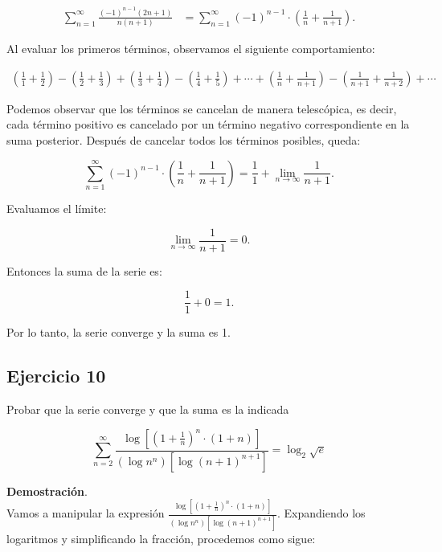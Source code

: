 \documentclass{article}
\begin{document}
    $$
    \begin{align*}
    \sum_{n=1}^{\infty} \frac{(-1)^{n-1}(2 n+1)}{n(n+1)} &= \sum_{n=1}^{\infty}(-1)^{n-1} \cdot\left(\frac{1}{n}+\frac{1}{n+1}\right).
    \end{align*}
    $$

    Al evaluar los primeros términos, observamos el siguiente comportamiento:

    $$
    \begin{gathered}
    \left(\frac{1}{1}+\frac{1}{2}\right) - \left(\frac{1}{2}+\frac{1}{3}\right) + \left(\frac{1}{3}+\frac{1}{4}\right) - \left(\frac{1}{4}+\frac{1}{5}\right) + \cdots + \left(\frac{1}{n}+\frac{1}{n+1}\right) - \left(\frac{1}{n+1}+\frac{1}{n+2}\right) + \cdots
    \end{gathered}
    $$

    Podemos observar que los términos se cancelan de manera telescópica, es decir, cada término positivo es cancelado por un término negativo correspondiente en la suma posterior. Después de cancelar todos los términos posibles, queda:

    $$
    \sum_{n=1}^{\infty}(-1)^{n-1} \cdot\left(\frac{1}{n}+\frac{1}{n+1}\right) = \frac{1}{1} + \lim_{n \rightarrow \infty} \frac{1}{n+1}.
    $$

    Evaluamos el límite:

    $$
    \lim_{n \rightarrow \infty} \frac{1}{n+1} = 0.
    $$

    Entonces la suma de la serie es:

    $$
    \frac{1}{1} + 0 = 1.
    $$

    Por lo tanto, la serie converge y la suma es 1.

    \subsection*{Ejercicio 10}

    Probar que la serie converge y que la suma es la indicada

    $$
    \sum_{n=2}^{\infty} \frac{\log \left[\left(1+\frac{1}{n}\right)^{n} \cdot(1+n)\right]}{\left(\log n^{n}\right)\left[\log (n+1)^{n+1}\right]}=\log _{2} \sqrt{e}
    $$

    \textbf{Demostración}.\\

    Vamos a manipular la expresión $\frac{\log \left[\left(1+\frac{1}{n}\right)^{n} \cdot(1+n)\right]}{\left(\log n^{n}\right)\left[\log (n+1)^{n+1}\right]}$. Expandiendo los logaritmos y simplificando la fracción, procedemos como sigue:
\end{document}
